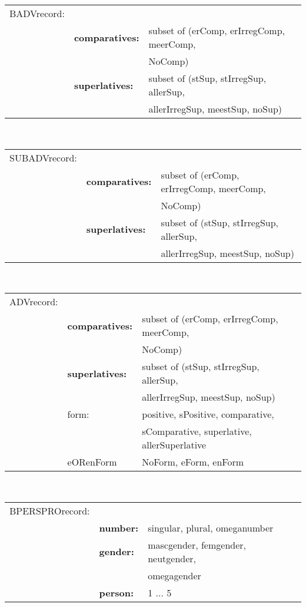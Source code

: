 \begin{tabular}{lll}
BADVrecord: &                     &              \\
            & {\bf comparatives:} & subset of (erComp, erIrregComp, meerComp, \\
            &                     &                            NoComp) \\
            & {\bf superlatives:} & subset of (stSup, stIrregSup, allerSup, \\
            &                     & allerIrregSup, meestSup, noSup)    \\
\end{tabular}
\\
\begin{tabular}{lll}
SUBADVrecord: &                   &              \\
            & {\bf comparatives:} & subset of (erComp, erIrregComp, meerComp, \\
            &                     &                            NoComp) \\
            & {\bf superlatives:} & subset of (stSup, stIrregSup, allerSup, \\
            &                     & allerIrregSup, meestSup, noSup) \\
\end{tabular}
\\
\begin{tabular}{lll}
ADVrecord: &                      &              \\
            & {\bf comparatives:} & subset of (erComp, erIrregComp, meerComp, \\
            &                     &                         NoComp)    \\
            & {\bf superlatives:} & subset of (stSup, stIrregSup, allerSup, \\
            &                     & allerIrregSup, meestSup, noSup) \\
            & form:               & positive, sPositive, comparative, \\
            &                   & sComparative, superlative, allerSuperlative \\
            & eORenForm           & NoForm, eForm, enForm \\
\end{tabular}
\\
\begin{tabular}{lll}
BPERSPROrecord: &                 &              \\
                & {\bf number:}   & singular, plural, omeganumber   \\
                & {\bf gender:}   & mascgender, femgender, neutgender, \\
                &                 &                     omegagender \\
                & {\bf person:}   & 1 ... 5                  \\
\end{tabular}
